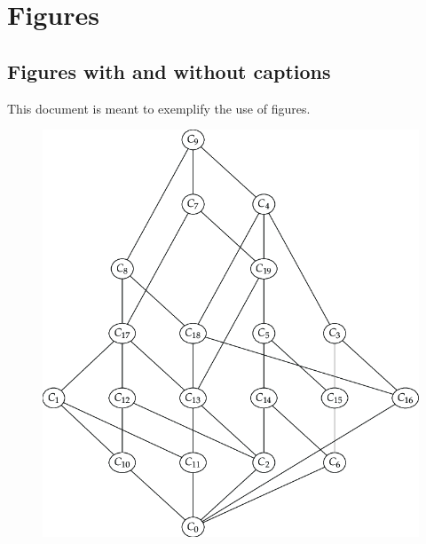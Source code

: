 \documentclass{article}
\begin{document}
  \section{Figures}
  
  \subsection{Figures with and without captions}
  
  This document is meant to exemplify the use of figures.
  
  \graphicspath{{tests/images/}}
  
  \begin{figure}[h]
  
    \includegraphics{complete_lattice}
  
  \end{figure}
  
\end{document}
